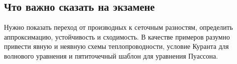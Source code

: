 \subsection{Что важно сказать на экзамене}

Нужно показать переход от производных к сеточным разностям, определить
аппроксимацию, устойчивость и сходимость. В качестве примеров разумно привести
явную и неявную схемы теплопроводности, условие Куранта для волнового уравнения и
пятиточечный шаблон для уравнения Пуассона.

\newpage